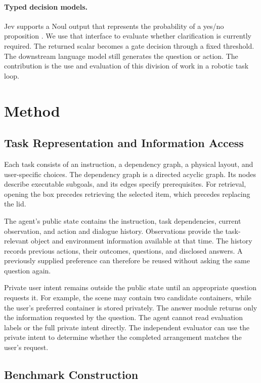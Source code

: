 \documentclass{article}
\begin{document}
\paragraph{Typed decision models.}
Jev supports a Noul output that represents the probability of a yes/no
proposition \citep{typesafe2026noul}. We use that interface to evaluate whether
clarification is currently required. The returned scalar becomes a gate
decision through a fixed threshold. The downstream language model still
generates the question or action. The contribution is the use and evaluation
of this division of work in a robotic task loop.

\section{Method}

\subsection{Task Representation and Information Access}

Each task consists of an instruction, a dependency graph, a physical layout,
and user-specific choices. The dependency graph is a directed acyclic graph.
Its nodes describe executable subgoals, and its edges specify prerequisites.
For retrieval, opening the box precedes retrieving the selected item, which
precedes replacing the lid.

The agent's public state contains the instruction, task dependencies, current
observation, and action and dialogue history. Observations provide the
task-relevant object and environment information available at that time.
The history records previous actions, their outcomes, questions, and disclosed
answers. A previously supplied preference can therefore be reused without
asking the same question again.

Private user intent remains outside the public state until an appropriate
question requests it. For example, the scene may contain two candidate
containers, while the user's preferred container is stored privately.
The answer module returns only the information requested by the question.
The agent cannot read evaluation labels or the full private intent directly.
The independent evaluator can use the private intent to determine whether the
completed arrangement matches the user's request.

\subsection{Benchmark Construction}
\end{document}

